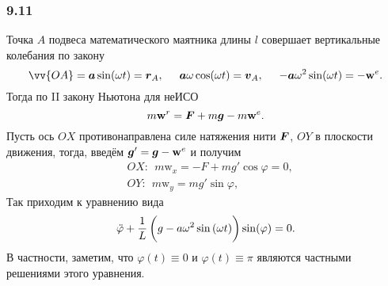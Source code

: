 \subsubsection*{9.11}

Точка $A$ подвеса математического маятника длины $l$ совершает вертикальные колебания по закону
$$
    \vv{OA} = \vc{a} \sin (\omega t) = \vc{r}_A,
    \hspace{0.5cm} 
    \vc{a} \omega \cos (\omega t) = \vc{v}_A,
    \hspace{0.5cm} 
    - \vc{a} \omega^2 \sin (\omega t) = -\vc{\mathrm{w}}^e.
$$
Тогда по II закону Ньютона для неИСО
\begin{equation}
    m \mbox{\boldmath $\mathrm{w}$}^r = \mbox{\boldmath $F$} + m \mbox{\boldmath $g$} - m \mbox{\boldmath $\mathrm{w}$}^e.
\end{equation}
Пусть ось $OX$ противонаправлена силе натяжения нити $\mbox{\boldmath $F$}$, $OY$ в плоскости движения, тогда, введём $\mbox{\boldmath $g$}' = \mbox{\boldmath $g$}-\mbox{\boldmath $\mathrm{w}$}^e$ и получим
\begin{align*}
    &OX: \ \  m \mathrm{w}_x = - F + m g' \cos \varphi  = 0,\\
    &OY: \ \  m \mathrm{w}_y = mg' \sin \varphi,
\end{align*}
Так приходим к уравнению вида
\begin{equation}
    \ddot{\varphi} +  \frac{1}{L} \left(
    \vphantom{\frac{1}{2} }
        g - a \omega^2 \sin \left(\omega t\right)
    \right) \sin (\varphi)= 0.
\end{equation}
В частности, заметим, что $\varphi(t)\equiv0$ и $\varphi(t) \equiv \pi$ являются частными решениями этого уравнения.
